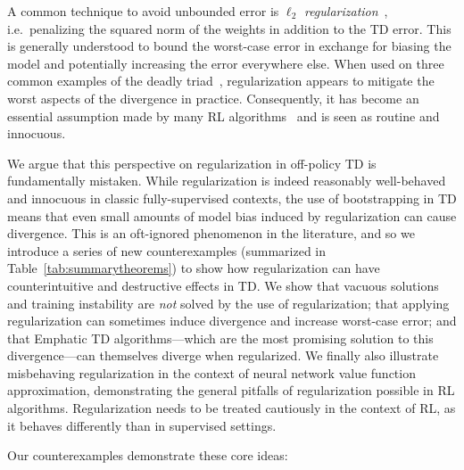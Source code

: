 A common technique to avoid unbounded error is $\ell_2$ \emph{regularization}~\cite{tikhonov1943stability}, i.e.\ penalizing the squared norm of the weights in addition to the TD error.  This is generally understood to bound the worst-case error in exchange for biasing the model and potentially increasing the error everywhere else.  When used on three common examples of the deadly triad~\cite[pg.260]{kolter2011fixed,baird1993counterexample,sutton2020reinforcement}, regularization appears to mitigate the worst aspects of the divergence in practice.  Consequently, it has become an essential assumption made by many RL algorithms~\cite{diddigi2019convergent,mahadevan2014proximal,sutton2009fast,yu2017convergence,zhang2020provably,zhang2021breaking,kumar2022dr} and is seen as routine and innocuous.

We argue that this perspective on regularization in off-policy TD is fundamentally mistaken.  While regularization is indeed reasonably well-behaved and innocuous in classic fully-supervised contexts, the use of bootstrapping in TD means that even small amounts of model bias induced by regularization can cause divergence.  This is an oft-ignored phenomenon in the literature, and so we introduce a series of new counterexamples (summarized in Table~\ref{tab:summarytheorems}) to show how regularization can have counterintuitive and destructive effects in TD.  We show that vacuous solutions and training instability are \emph{not} solved by the use of regularization; that applying regularization can sometimes induce divergence and increase worst-case error; and that Emphatic TD algorithms---which are the most promising solution to this divergence---can themselves diverge when regularized. We finally also illustrate misbehaving regularization in the context of neural network value function approximation, demonstrating the general pitfalls of regularization possible in RL algorithms.  Regularization needs to be treated cautiously in the context of RL, as it behaves differently than in supervised settings.

Our counterexamples demonstrate these core ideas:

